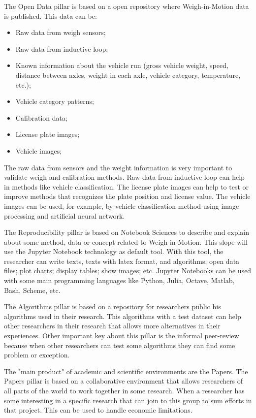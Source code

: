 \documentclass[a4paper]{article}
\begin{document}
{The Open Data pillar is based on a open repository where Weigh-in-Motion data is published. This data can be:

\begin{itemize}
\item Raw data from weigh sensors;
\item Raw data from inductive loop;
\item Known information about the vehicle run (gross vehicle weight, speed, distance between axles, weight in each axle, vehicle category, temperature, etc.);
\item Vehicle category patterns;
\item Calibration data;
\item License plate images;
\item Vehicle images;
\end{itemize}

The raw data from sensors and the weight information is very important to validate weigh and calibration methods. Raw data from inductive loop can help in methods like vehicle classification. The license plate images can help to test or improve methods that recognizes the plate position and license value. The vehicle images can be used, for example, by vehicle classification method using image processing and artificial neural network.

The Reproducibility pillar is based on Notebook Sciences to describe and explain about some method, data or concept related to Weigh-in-Motion. This slope will use the Jupyter Notebook technology as default tool. With this tool, the researcher can write texts, texts with latex format, and algorithms; open data files; plot charts; display tables; show images; etc. Jupyter Notebooks can be used with some main programming languages like Python, Julia, Octave, Matlab, Bash, Scheme, etc.

The Algorithms pillar is based on a repository for researchers public his algorithms used in their research. This algorithms with a test dataset can help other researchers in their research that allows more alternatives in their experiences. Other important key about this pillar is the informal peer-review because when other researchers can test some algorithms they can find some problem or exception.

The "main product" of academic and scientific environments are the Papers. The Papers pillar is based on a collaborative environment that allows researchers of all parts of the world to work together in some research. When a researcher has some interesting in a specific research that can join to this group to sum efforts in that project. This can be used to handle economic limitations.

}
\end{document}
